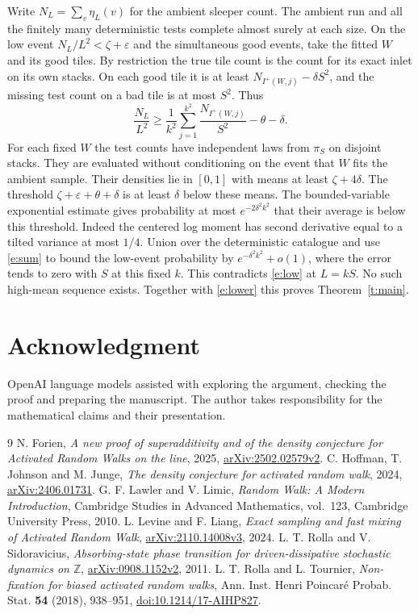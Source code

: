 \documentclass[11pt]{amsart}
\newcommand{\1}{\mathbf 1}
\begin{document}
Write \(N_L=\sum_v\eta_L(v)\) for the ambient sleeper count. The ambient run and all the finitely many deterministic tests complete almost surely at each size. On the low event \(N_L/L^2<\zeta+\varepsilon\) and the simultaneous good events, take the fitted \(W\) and its good tiles. By restriction the true tile count is the count for its exact inlet on its own stacks. On each good tile it is at least \(N_{I^+(W,j)}-\delta S^2\), and the missing test count on a bad tile is at most \(S^2\). Thus
\begin{equation}\label{e:sum}
 \frac{N_L}{L^2}\ge
    \frac1{k^2}\sum_{j=1}^{k^2}\frac{N_{I^+(W,j)}}{S^2}
       -\theta-\delta .
\end{equation}
For each fixed \(W\) the test counts have independent laws from \(\pi_S\) on disjoint stacks. They are evaluated without conditioning on the event that \(W\) fits the ambient sample. Their densities lie in \([0,1]\) with means at least \(\zeta+4\delta\). The threshold \(\zeta+\varepsilon+\theta+\delta\) is at least \(\delta\) below these means. The bounded-variable exponential estimate gives probability at most \(e^{-2\delta^2 k^2}\) that their average is below this threshold. Indeed the centered log moment has second derivative equal to a tilted variance at most \(1/4\). Union over the deterministic catalogue and use \eqref{e:sum} to bound the low-event probability by \(e^{-\delta^2k^2}+o(1)\), where the error tends to zero with \(S\) at this fixed \(k\). This contradicts \eqref{e:low} at \(L=kS\). No such high-mean sequence exists. Together with \eqref{e:lower} this proves Theorem~\ref{t:main}.

\section*{Acknowledgment}
OpenAI language models assisted with exploring the argument, checking the proof and preparing the manuscript. The author takes responsibility for the mathematical claims and their presentation.

\begin{thebibliography}{9}
 N. Forien, \emph{A new proof of superadditivity and of the density conjecture for Activated Random Walks on the line}, 2025, \href{https://arxiv.org/abs/2502.02579v2}{arXiv:2502.02579v2}.
 C. Hoffman, T. Johnson and M. Junge, \emph{The density conjecture for activated random walk}, 2024, \href{https://arxiv.org/abs/2406.01731}{arXiv:2406.01731}.
 G. F. Lawler and V. Limic, \emph{Random Walk: A Modern Introduction}, Cambridge Studies in Advanced Mathematics, vol.~123, Cambridge University Press, 2010.
 L. Levine and F. Liang, \emph{Exact sampling and fast mixing of Activated Random Walk}, \href{https://arxiv.org/abs/2110.14008v3}{arXiv:2110.14008v3}, 2024.
 L. T. Rolla and V. Sidoravicius, \emph{Absorbing-state phase transition for driven-dissipative stochastic dynamics on \(\mathbb Z\)}, \href{https://arxiv.org/abs/0908.1152v2}{arXiv:0908.1152v2}, 2011.
 L. T. Rolla and L. Tournier, \emph{Non-fixation for biased activated random walks}, Ann. Inst. Henri Poincar\'e Probab. Stat. \textbf{54} (2018), 938--951, \href{https://doi.org/10.1214/17-AIHP827}{doi:10.1214/17-AIHP827}.
\end{thebibliography}
\end{document}
